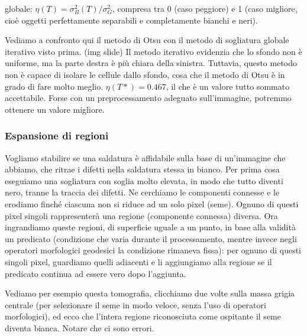 \documentclass[a4paper,11pt]{article}
\begin{document}
globale: $\eta(T) = \sigma_B^2(T) / \sigma_G^2$, compresa tra 0 (caso peggiore) e 1 (caso migliore, cioè oggetti perfettamente separabili e completamente
bianchi e neri).
\par
Vediamo a confronto qui il metodo di Otsu con il metodo di sogliatura globale iterativo visto prima. (img slide)
Il metodo iterativo evidenzia che lo sfondo non è uniforme, ma la parte destra è più chiara della sinistra. Tuttavia, questo metodo non è capace
di isolare le cellule dallo sfondo, cosa che il metodo di Otsu è in grado di fare molto meglio. $\eta(T*) = 0.467$, il che è un valore tutto sommato accettabile.
Forse con un preprocessamento adeguato sull'immagine, potremmo ottenere un valore migliore.

\subsubsection{Espansione di regioni}
Vogliamo stabilire se una saldatura è affidabile sulla base di un'immagine che abbiamo, che ritrae i difetti nella saldatura stessa in bianco.
Per prima cosa eseguiamo una sogliatura con soglia molto elevata, in modo che tutto diventi nero, tranne la traccia dei difetti.
Ne cerchiamo le componenti connesse e le erodiamo finché ciascuna non si riduce ad un solo pixel (seme). Ognuno di questi pixel singoli rappresenterà una regione (componente connessa)
diversa. Ora ingrandiamo queste regioni, di superficie uguale a un punto, in base alla validità un predicato (condizione che varia durante il processamento,
mentre invece negli operatori morfologici geodesici la condizione rimaneva fissa): per ognuno di questi singoli pixel, guardiamo quelli adiacenti e li aggiungiamo alla regione
se il predicato continua ad essere vero dopo l'aggiunta.
\par
Vediamo per esempio questa tomografia, clicchiamo due volte sulla massa grigia centrale (per selezionare il seme in modo veloce, senza l'uso di
operatori morfologici), ed ecco che l'intera regione riconosciuta come ospitante il seme diventa bianca. Notare che ci sono errori.
\end{document}

